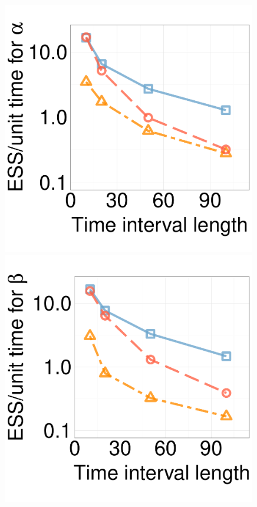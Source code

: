   \begin{figure}[H]    
  \centering
  \begin{minipage}[hp]{0.24\linewidth}
  \centering
    \includegraphics [width=0.99\textwidth, angle=0]{figs/new_experiment_figs/ESS_vs_t_alpha_fixobservation.pdf}
    \end{minipage}
  \begin{minipage}[hp]{0.24\linewidth}
  \centering
    \includegraphics [width=0.99\textwidth, angle=0]{figs/new_experiment_figs/ESS_vs_t_beta_fixobservation.pdf}

\end{minipage}
\end{figure}
